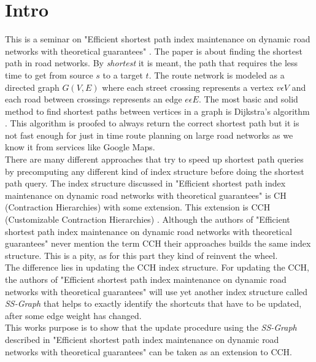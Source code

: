 \documentclass[twocolumn]{article}
\begin{document}


\section{Intro}

This is a seminar on "Efficient shortest path index maintenance on dynamic
road networks with theoretical guarantees" \cite{Ouyang2020}. The paper is
about finding the shortest path in road networks. By \textit{shortest} it is meant,
the path that requires the less time to get from source $s$ to a target $t$. The route
network is modeled as a directed graph $G(V,E)$ where each street crossing represents a
vertex $v \epsilon V$ and each road between crossings represents an edge $e \epsilon E$.
The most basic and solid method to find shortest paths between vertices in a graph is
Dijkstra's algorithm \cite{Dijkstra1959}. This algorithm is proofed to always return the
correct shortest path but it is not fast enough for just in time route planning on large
road networks as we know it from services like Google Maps.
\\
There are many
different approaches that try to speed up shortest path queries by precomputing
any different kind of index structure before doing the shortest path query. The index
structure discussed in "Efficient shortest path index maintenance on dynamic road networks with theoretical guarantees"
\cite{Ouyang2020} is CH (Contraction Hierarchies)\cite{Geisberger2012}
with some extension. This extension is CCH (Customizable Contraction Hierarchies)
\cite{Dibbelt2014}. Although the authors of "Efficient shortest path index maintenance on dynamic road networks with theoretical guarantees"
never mention the term
CCH their approaches builds the same index structure. This is a pity, as for this part
they kind of reinvent the wheel. 
\\
The difference lies in updating
the CCH index structure. For updating the CCH, the authors of "Efficient shortest path index maintenance on dynamic road networks with theoretical guarantees"
\cite{Ouyang2020} will use yet another
index structure called \textit{SS-Graph} that helps to exactly identify the shortcuts that
have to be updated, after some edge weight has changed. 
\\
This works purpose is to show that the update procedure using the \textit{SS-Graph} described in 
"Efficient shortest path index maintenance on dynamic road networks with theoretical guarantees" \cite{Ouyang2020} can be taken as an 
extension to CCH. 
\\
\end{document}
